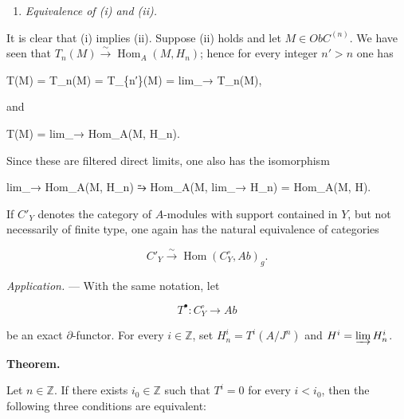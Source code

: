 \documentclass[
  11pt,
  a4paper,
]{book}
\newenvironment{Shaded}{}{}
\newcommand{\NormalTok}[1]{#1}
\providecommand{\tightlist}{%
  \setlength{\itemsep}{0pt}\setlength{\parskip}{0pt}}
\begin{document}
\begin{enumerate}
\def\labelenumi{\alph{enumi})}
\setcounter{enumi}{1}
\tightlist
\item
  \emph{Equivalence of (i) and (ii).}
\end{enumerate}

It is clear that (i) implies (ii). Suppose (ii) holds and let
\(M \in Ob C^{(n)}\). We have seen that \(T_{n}(M)
\xrightarrow{\sim} \operatorname{Hom}_{A}(M, H_{n})\); hence for every
integer \(n' > n\) one has

\begin{Shaded}
\begin{Highlighting}[]
\NormalTok{T(M) = T\_n(M) = T\_\{n′\}(M) = lim\_→ T\_n(M),}
\end{Highlighting}
\end{Shaded}

and

\begin{Shaded}
\begin{Highlighting}[]
\NormalTok{T(M) = lim\_→ Hom\_A(M, H\_n).}
\end{Highlighting}
\end{Shaded}

Since these are filtered direct limits, one also has the isomorphism

\begin{Shaded}
\begin{Highlighting}[]
\NormalTok{lim\_→ Hom\_A(M, H\_n) ⥲ Hom\_A(M, lim\_→ H\_n) = Hom\_A(M, H).}
\end{Highlighting}
\end{Shaded}

If \(C'_{Y}\) denotes the category of \(A\)-modules with support
contained in \(Y\), but not necessarily of finite type, one again has
the natural equivalence of categories

\[ C'_{Y} \xrightarrow{\sim} \operatorname{Hom}(C^{\circ}_{Y}, Ab)_{g}. \]

\emph{Application.} --- With the same notation, let

\[ T^{\bullet} : C^{\circ}_{Y} \longrightarrow Ab \]

be an exact \(\partial\)-functor. For every \(i \in \mathbb{Z}\), set
\(H^{i}_{n} = T^{i}(A/J^{n})\) and \(H^{i} = \varinjlim
H^{i}_{n}\).

\textbf{Theorem.}

Let \(n \in \mathbb{Z}\). If there exists \(i_{0} \in \mathbb{Z}\) such
that \(T^{i} = 0\) for every \(i < i_{0}\), then the following three
conditions are equivalent:
\end{document}
